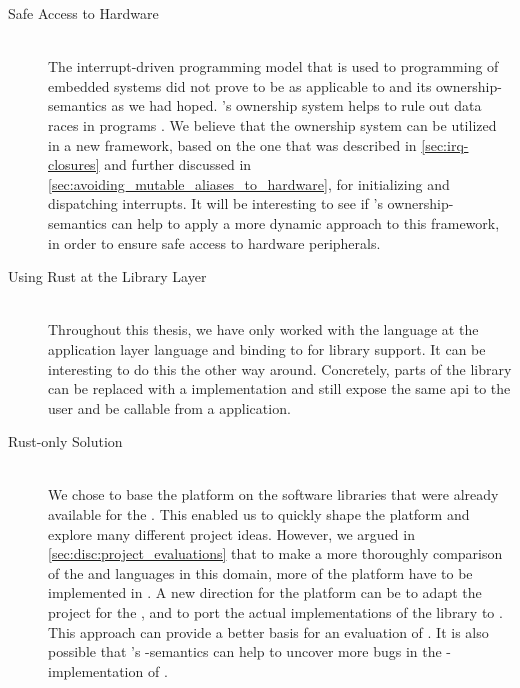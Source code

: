 \begin{description}
\item[Safe Access to Hardware] \hfill \\
  The interrupt-driven programming model that is used to programming of embedded systems did not prove to be as applicable to {\rust} and its ownership-semantics as we had hoped.
  {\rust}'s ownership system helps to rule out data races in programs \cite{web:rust_book}.
  We believe that the ownership system can be utilized in a new framework, based on the one that was described in \autoref{sec:irq-closures} and further discussed in \autoref{sec:avoiding_mutable_aliases_to_hardware}, for initializing and dispatching interrupts.
  It will be interesting to see if {\rust}'s ownership-semantics can help to apply a more dynamic approach to this framework, in order to ensure safe access to hardware peripherals.

\item[Using Rust at the Library Layer] \hfill \\
  Throughout this thesis, we have only worked with the {\rust} language at the application layer language and binding to {\C} for library support.
  It can be interesting to do this the other way around.
  Concretely, parts of the {\emlib} library can be replaced with a {\rust} implementation and still expose the same \gls{api} to the user and be callable from a {\C} application.

\item[Rust-only Solution] \hfill \\
  We chose to base the {\rg} platform on the software libraries that were already available for the {\gecko}.
  This enabled us to quickly shape the platform and explore many different project ideas.
  However, we argued in \autoref{sec:disc:project_evaluations} that to make a more thoroughly comparison of the {\C} and {\rust} languages in this domain, more of the platform have to be implemented in {\rust}.
  A new direction for the platform can be to adapt the {\zinc} project for the {\gecko}, and to port the actual implementations of the {\emlib} library to {\rust}.
  This approach can provide a better basis for an evaluation of {\rust}.
  It is also possible that {\rust}'s -semantics can help to uncover more bugs in the {\C}-implementation of {\emlib}.

\end{description}
